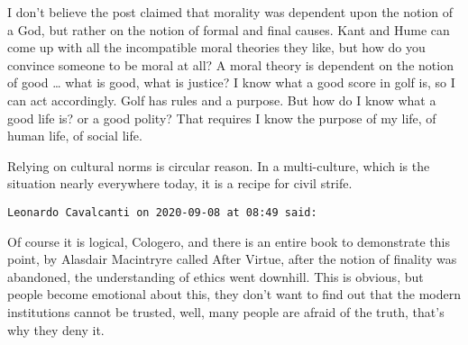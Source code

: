 \begin{footnotesize}
\begin{sffamily}
I don't believe the post claimed that morality was dependent upon the notion of a God, but rather on the notion of formal and final causes. Kant and Hume can come up with all the incompatible moral theories they like, but how do you convince someone to be moral at all? A moral theory is dependent on the notion of good … what is good, what is justice? I know what a good score in golf is, so I can act accordingly. Golf has rules and a purpose. But how do I know what a good life is? or a good polity? That requires I know the purpose of my life, of human life, of social life. 

Relying on cultural norms is circular reason. In a multi-culture, which is the situation nearly everywhere today, it is a recipe for civil strife.


\hfill

\texttt{Leonardo Cavalcanti on 2020-09-08 at 08:49 said: }

Of course it is logical, Cologero, and there is an entire book to demonstrate this point, by Alasdair Macintryre called After Virtue, after the notion of finality was abandoned, the understanding of ethics went downhill. This is obvious, but people become emotional about this, they don't want to find out that the modern institutions cannot be trusted, well, many people are afraid of the truth, that's why they deny it.


\end{sffamily}\end{footnotesize}

